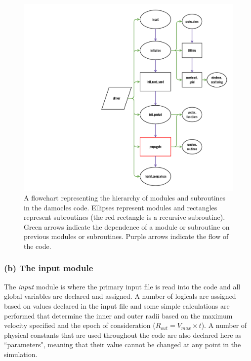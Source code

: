        \begin{figure}
        \centering
        \includegraphics[scale=0.18, trim=430mm 20mm 30mm 25mm]{chapters/chapter2/code_modules_flowchart.png}
        \caption{A flowchart representing the hierarchy of modules and subroutines in the {\sc damocles} code.  Ellipses represent modules and rectangles represent subroutines (the red rectangle is a recursive subroutine).  Green arrows indicate the dependence of a module or subroutine on previous modules or subroutines.  Purple arrows indicate the flow of the code.}
        \label{fig:flowchart_mods}
        \end{figure}

        
        \subsubsection{(b) The input module}
        The \textit{input} module is where the primary input file is read into the code and all global variables are declared and assigned.  A number of logicals are assigned based on values declared in the input file and some simple calculations are performed that determine the inner and outer radii based on the maximum velocity specified and the epoch of consideration ($R_{out} = V_{max} \times t$).  A number of physical constants that are used throughout the code are also declared here as ``parameters", meaning that their value cannot be changed at any point in the simulation.
        
